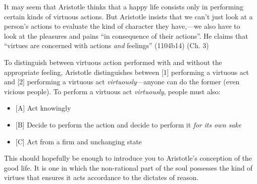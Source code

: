 \documentclass[oneside]{article}
\begin{document}
It may seem that Aristotle thinks that a happy life consists only in performing certain kinds of virtuous actions. But Aristotle insists that we can't just look at a person's actions to evaluate the kind of character they have,---we also have to look at the pleasures and pains ``in consequence of their actions''. He claims that ``virtues are concerned with actions \emph{and} feelings'' (1104b14) (Ch. 3)

To distinguish between virtuous action performed with and without the appropriate feeling, Aristotle distinguishes between [1] performing a virtuous act and [2] performing a virtuous act \emph{virtuously}---anyone can do the former (even vicious people). To perform a virtuous act \emph{virtuously}, people must also:
\begin{itemize}
\item{[A] Act knowingly
}\item{[B] Decide to perform the action and decide to perform it \emph{for its own sake}}\item{[C] Act from a firm and unchanging state}\end{itemize}
This should hopefully be enough to introduce you to Aristotle's conception of the good life. It is one in which the non-rational part of the soul possesses the kind of virtues that ensures it acts accordance to the dictates of reason. 
\end{document}
